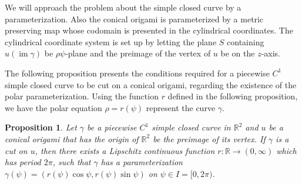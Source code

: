 \documentclass{amsart}
\theoremstyle{plain}
\newtheorem{proposition}[theorem]{Proposition}
\theoremstyle{definition}
\theoremstyle{remark}
\DeclareMathOperator{\im}{im}
\begin{document}
We will approach the problem about the simple closed curve by a parameterization.
Also the conical origami is parameterized by a metric preserving map whose codomain is presented in the cylindrical coordinates.
The cylindrical coordinate system is set up by letting the plane $S$ containing $u(\im \gamma)$ be $\rho\psi$-plane and the preimage of the vertex of $u$ be on the $z$-axis.

The following proposition presents the conditions required for a piecewise $C^1$ simple closed curve to be cut on a conical origami, regarding the existence of the polar parameterization.
Using the function $r$ defined in the following proposition, we have the polar equation $\rho=r(\psi)$ represent the curve $\gamma$.



\begin{proposition}\label{2.1} %
Let $\gamma$ be a piecewise $C^1$ simple closed curve in $\mathbb{R}^2$ and $u$ be a conical origami that has the origin of $\mathbb{R}^2$ be the preimage of its vertex.
If $\gamma$ is a cut on $u$, then there exists a Lipschitz continuous function $r:\mathbb{R}\to(0,\infty)$ which has period $2\pi$, such that $\gamma$ has a parameterization $\gamma(\psi)=(r(\psi)\cos\psi,r(\psi)\sin\psi)$ on $\psi\in I=[0,2\pi)$.
\end{proposition}
\end{document}
